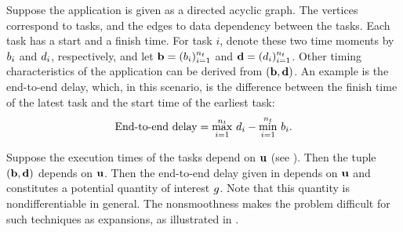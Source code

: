 Suppose the application is given as a directed acyclic graph. The vertices
correspond to tasks, and the edges to data dependency between the tasks. Each
task has a start and a finish time. For task $i$, denote these two time moments
by $b_i$ and $d_i$, respectively, and let $\mathbf{b} = (b_i)_{i=1}^{n_t}$ and $\mathbf{d} =
(d_i)_{i=1}^{n_t}$. Other timing characteristics of the application can be
derived from $(\mathbf{b}, \mathbf{d})$. An example is the end-to-end delay, which, in this
scenario, is the difference between the finish time of the latest task and the
start time of the earliest task:
\begin{equation} \elab{end-to-end-delay}
  \text{End-to-end delay} = \max_{i = 1}^\nt \, \d_i - \min_{i = 1}^\nt \, \b_i.
\end{equation}

Suppose the execution times of the tasks depend on $\mathbf{u}$ (see ).
Then the tuple $(\mathbf{b}, \mathbf{d})$ depends on $\mathbf{u}$. Then the end-to-end delay given in
 depends on $\mathbf{u}$ and constitutes a potential quantity of
interest $g$. Note that this quantity is nondifferentiable in general. The
nonsmoothness makes the problem difficult for such techniques as 
expansions, as illustrated in .

